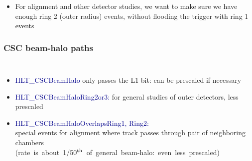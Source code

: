 \documentclass[compress]{beamer}
\begin{document}
\begin{frame}
\begin{itemize}
\vspace{0.2 cm}
\item For alignment and other detector studies, we want to make sure we have enough ring 2 (outer radius) events, without flooding the trigger with ring 1 events

\end{itemize}
\end{frame}

\begin{frame}
\frametitle{CSC beam-halo paths}

\begin{columns}

\begin{itemize}
\item \textcolor{darkblue}{HLT\_CSCBeamHalo} only passes the L1 bit: can be prescaled if necessary
\item \textcolor{darkblue}{HLT\_CSCBeamHaloRing2or3:} for general studies of outer detectors, less prescaled
\item \textcolor{darkblue}{HLT\_CSCBeamHaloOverlapsRing1, Ring2:} \\ special events for alignment where track passes through pair of neighboring chambers \\ \mbox{\scriptsize (rate is about 1/50$^{\mbox{\scriptsize th}}$ of general beam-halo: even less prescaled)\hspace{-1 cm}}
\end{itemize}



\end{columns}
\end{frame}
\end{document}
